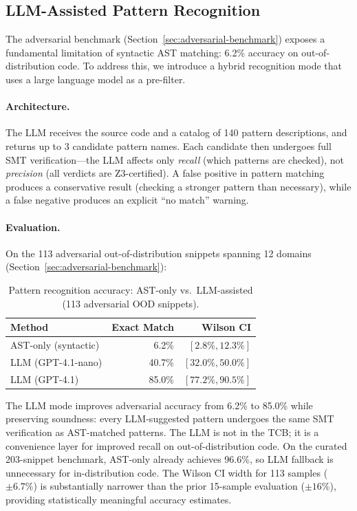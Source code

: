 \documentclass[11pt]{article}
\begin{document}
\subsection{LLM-Assisted Pattern Recognition}
\label{sec:llm-recognition}

The adversarial benchmark (Section~\ref{sec:adversarial-benchmark})
exposes a fundamental limitation of syntactic AST matching: 6.2\%
accuracy on out-of-distribution code.  To address this, we introduce
a hybrid recognition mode that uses a large language model as
a pre-filter.

\paragraph{Architecture.}
The LLM receives the source code and a catalog of 140 pattern
descriptions, and returns up to 3 candidate pattern names.
Each candidate then undergoes full SMT verification---the LLM
affects only \emph{recall} (which patterns are checked), not
\emph{precision} (all verdicts are Z3-certified).
A false positive in pattern matching produces a conservative
result (checking a stronger pattern than necessary), while
a false negative produces an explicit ``no match'' warning.

\paragraph{Evaluation.}
On the 113 adversarial out-of-distribution snippets spanning
12 domains (Section~\ref{sec:adversarial-benchmark}):

\begin{table}[ht]
\centering
\caption{Pattern recognition accuracy: AST-only vs.\ LLM-assisted
(113 adversarial OOD snippets).}
\label{tab:llm-accuracy}
\small
\begin{tabular}{lrr}
\toprule
\textbf{Method} & \textbf{Exact Match} & \textbf{Wilson CI} \\
\midrule
AST-only (syntactic)      & 6.2\%  & $[2.8\%, 12.3\%]$ \\
LLM (GPT-4.1-nano)        & 40.7\% & $[32.0\%, 50.0\%]$ \\
LLM (GPT-4.1)             & 85.0\% & $[77.2\%, 90.5\%]$ \\
\bottomrule
\end{tabular}
\end{table}

\noindent
The LLM mode improves adversarial accuracy from 6.2\% to 85.0\%
while preserving soundness: every LLM-suggested pattern undergoes
the same SMT verification as AST-matched patterns.
The LLM is not in the TCB; it is a convenience layer for improved
recall on out-of-distribution code.
On the curated 203-snippet benchmark, AST-only already achieves
96.6\%, so LLM fallback is unnecessary for in-distribution code.
The Wilson CI width for 113 samples ($\pm 6.7\%$) is substantially
narrower than the prior 15-sample evaluation ($\pm 16\%$),
providing statistically meaningful accuracy estimates.
\end{document}
